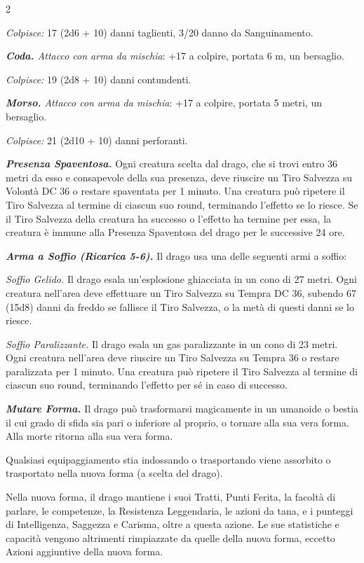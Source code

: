 \begin{multicols}{2}
{\emph{Colpisce:} 17 (2d6 + 10) danni taglienti, 3/20 danno da Sanguinamento.

\emph{\textbf{Coda.} Attacco con arma da mischia}: +17 a colpire, portata 6 m, un bersaglio.

\emph{Colpisce:} 19 (2d8 + 10) danni contundenti.

\emph{\textbf{Morso.} Attacco con arma da mischia}: +17 a colpire, portata 5 metri, un bersaglio.

\emph{Colpisce:} 21 (2d10 + 10) danni perforanti.

\emph{\textbf{Presenza Spaventosa.}} Ogni creatura scelta dal drago, che si trovi entro 36 metri da esso e consapevole della sua presenza, deve riuscire un Tiro Salvezza su Volontà DC 36 o restare spaventata per 1 minuto. Una creatura può ripetere il Tiro Salvezza al termine di ciascun suo round, terminando l'effetto se lo riesce. Se il Tiro Salvezza della creatura ha successo o l'effetto ha termine per essa, la creatura è immune alla Presenza Spaventosa del drago per le successive 24 ore.

\emph{\textbf{Arma a Soffio (Ricarica 5-6).}} Il drago usa una delle seguenti armi a soffio:

\emph{Soffio Gelido.} Il drago esala un'esplosione ghiacciata in un cono di 27 metri. Ogni creatura nell'area deve effettuare un Tiro Salvezza su Tempra DC 36, subendo 67 (15d8) danni da freddo se fallisce il Tiro Salvezza, o la metà di questi danni se lo riesce.

\emph{Soffio Paralizzante.} Il drago esala un gas paralizzante in un cono di 23 metri. Ogni creatura nell'area deve riuscire un Tiro Salvezza su Tempra 36 o restare paralizzata per 1 minuto. Una creatura può ripetere il Tiro Salvezza al termine di ciascun suo round, terminando l'effetto per sé in caso di successo.

\emph{\textbf{Mutare Forma.}} Il drago può trasformarsi magicamente in un umanoide o bestia il cui grado di sfida sia pari o inferiore al proprio, o tornare alla sua vera forma. Alla morte ritorna alla sua vera forma.

Qualsiasi equipaggiamento stia indossando o trasportando viene assorbito o trasportato nella nuova forma (a scelta del drago).

Nella nuova forma, il drago mantiene i suoi Tratti, Punti Ferita, la facoltà di parlare, le competenze, la Resistenza Leggendaria, le azioni da tana, e i punteggi di Intelligenza, Saggezza e Carisma, oltre a questa azione. Le sue statistiche e capacità vengono altrimenti rimpiazzate da quelle della nuova forma, eccetto Azioni aggiuntive della nuova forma.

}
\end{multicols}
